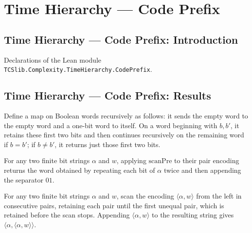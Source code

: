 \section{Time Hierarchy --- Code Prefix}
\subsection*{Time Hierarchy --- Code Prefix: Introduction}

Declarations of the Lean module \texttt{TCSlib.Complexity.TimeHierarchy.CodePrefix}.

\subsection*{Time Hierarchy --- Code Prefix: Results}

\begin{definition}
\label{Complexity.TimeHierarchy.scanPre}
\leanok
Define a map on Boolean words recursively as follows: it sends the empty word to the
empty word and a one-bit word to itself. On a word beginning with $b,b'$, it retains
these first two bits and then continues recursively on the remaining word if $b=b'$; if
$b\ne b'$, it returns just those first two bits.
\end{definition}

\begin{lemma}
\label{Complexity.TimeHierarchy.scanPre_pairEncode}
\leanok
{}
For any two finite bit strings $\alpha$ and $w$, applying $\mathrm{scanPre}$ to their pair encoding returns the word obtained by repeating each bit of $\alpha$ twice and then appending the separator $01$.
\end{lemma}

\begin{lemma}
\label{Complexity.TimeHierarchy.scanPre_pairEncode_append}
\leanok
{}
For any two finite bit strings $\alpha$ and $w$, scan the encoding
$\langle\alpha,w\rangle$ from the left in consecutive pairs, retaining each pair until
the first unequal pair, which is retained before the scan stops. Appending
$\langle\alpha,w\rangle$ to the resulting string gives
$\langle\alpha,\langle\alpha,w\rangle\rangle$.
\end{lemma}

